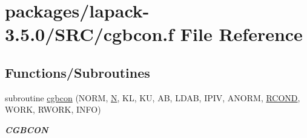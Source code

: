 \hypertarget{cgbcon_8f}{}\section{packages/lapack-\/3.5.0/\+S\+R\+C/cgbcon.f File Reference}
\label{cgbcon_8f}
\subsection*{Functions/\+Subroutines}
\begin{DoxyCompactItemize}
\item 
subroutine \hyperlink{group__complexGBcomputational_ga0c12e988f6edb779abf338f6b4de4d9e}{cgbcon} (N\+O\+R\+M, \hyperlink{polmisc_8c_a0240ac851181b84ac374872dc5434ee4}{N}, K\+L, K\+U, A\+B, L\+D\+A\+B, I\+P\+I\+V, A\+N\+O\+R\+M, \hyperlink{superlu__enum__consts_8h_af00a42ecad444bbda75cde1b64bd7e72a9b5c151728d8512307565994c89919d5}{R\+C\+O\+N\+D}, W\+O\+R\+K, R\+W\+O\+R\+K, I\+N\+F\+O)
\begin{DoxyCompactList}\small\item\em {\bfseries C\+G\+B\+C\+O\+N} \end{DoxyCompactList}\end{DoxyCompactItemize}
